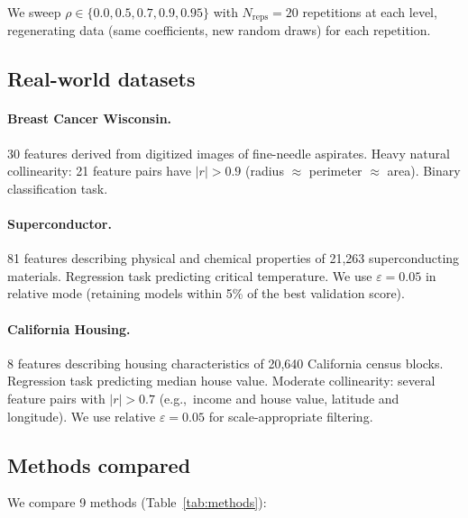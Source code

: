 \documentclass[11pt]{article}
\newcommand{\rhovar}{\rho}
\newcommand{\eg}{e.g.,\ }
\begin{document}
We sweep $\rhovar \in \{0.0, 0.5, 0.7, 0.9, 0.95\}$ with $N_{\text{reps}}
= 20$ repetitions at each level, regenerating data (same coefficients, new
random draws) for each repetition.

\subsection{Real-world datasets}

\paragraph{Breast Cancer Wisconsin.}
30 features derived from digitized images of fine-needle aspirates. Heavy
natural collinearity: 21 feature pairs have $|r| > 0.9$ (radius $\approx$
perimeter $\approx$ area). Binary classification task.

\paragraph{Superconductor.}
81 features describing physical and chemical properties of 21,263
superconducting materials. Regression task predicting critical temperature.
We use $\varepsilon = 0.05$ in relative mode (retaining models within
5\% of the best validation score).

\paragraph{California Housing.}
8 features describing housing characteristics of 20,640 California
census blocks. Regression task predicting median house value. Moderate
collinearity: several feature pairs with $|r| > 0.7$ (\eg income and
house value, latitude and longitude).
We use relative $\varepsilon = 0.05$ for scale-appropriate filtering.

\subsection{Methods compared}

We compare 9 methods (Table~\ref{tab:methods}):
\end{document}
